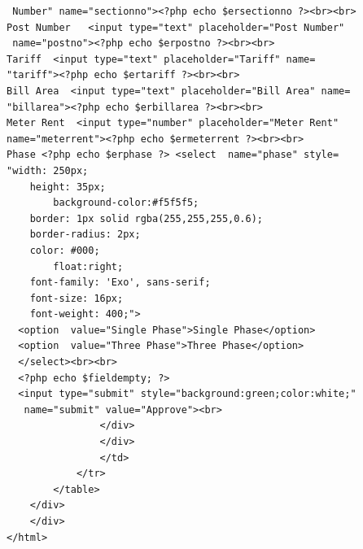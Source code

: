 \documentclass[12pt,a4paper,oneside]{report}
\begin{document}
\begin{lstlisting}
 Number" name="sectionno"><?php echo $ersectionno ?><br><br>
Post Number   <input type="text" placeholder="Post Number"
 name="postno"><?php echo $erpostno ?><br><br>
Tariff  <input type="text" placeholder="Tariff" name=
"tariff"><?php echo $ertariff ?><br><br>
Bill Area  <input type="text" placeholder="Bill Area" name=
"billarea"><?php echo $erbillarea ?><br><br>
Meter Rent  <input type="number" placeholder="Meter Rent" 
name="meterrent"><?php echo $ermeterrent ?><br><br>
Phase <?php echo $erphase ?> <select  name="phase" style=
"width: 250px;
	height: 35px;
        background-color:#f5f5f5;
	border: 1px solid rgba(255,255,255,0.6);
	border-radius: 2px;
	color: #000;
        float:right;
	font-family: 'Exo', sans-serif;
	font-size: 16px;
	font-weight: 400;">
  <option  value="Single Phase">Single Phase</option>
  <option  value="Three Phase">Three Phase</option>
  </select><br><br>
  <?php echo $fieldempty; ?>
  <input type="submit" style="background:green;color:white;"
   name="submit" value="Approve"><br>               
                </div>
                </div> 
                </td>
            </tr>
        </table>
    </div>
    </div>
</html>       


    \end{lstlisting}
\end{document}
